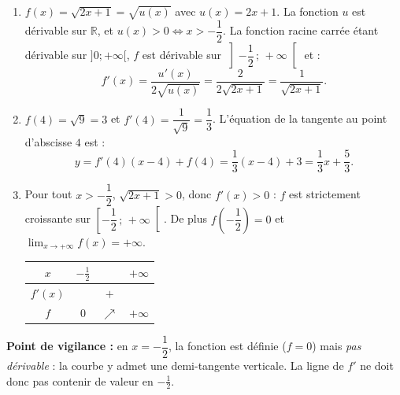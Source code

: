 \documentclass[11pt]{article}
\begin{document}
\begin{corrige}
\begin{enumerate}
\item $f(x)=\sqrt{2x+1}=\sqrt{u(x)}$ avec $u(x)=2x+1$. La fonction $u$ est dérivable sur $\mathbb{R}$, et $u(x)>0 \iff x>-\dfrac{1}{2}$. La fonction racine carrée étant dérivable sur $]0;+\infty[$, $f$ est dérivable sur $\left]-\dfrac{1}{2}\,;\,+\infty\right[$ et :
\[ f'(x)=\frac{u'(x)}{2\sqrt{u(x)}}=\frac{2}{2\sqrt{2x+1}}=\frac{1}{\sqrt{2x+1}}. \]
\item $f(4)=\sqrt{9}=3$ et $f'(4)=\dfrac{1}{\sqrt{9}}=\dfrac{1}{3}$. L'équation de la tangente au point d'abscisse $4$ est :
\[ y = f'(4)(x-4)+f(4) = \frac{1}{3}(x-4)+3 = \frac{1}{3}x+\frac{5}{3}. \]
\item Pour tout $x>-\dfrac{1}{2}$, $\sqrt{2x+1}>0$, donc $f'(x)>0$ : $f$ est strictement croissante sur $\left[-\dfrac{1}{2}\,;\,+\infty\right[$. De plus $f\left(-\dfrac{1}{2}\right)=0$ et $\lim_{x\to+\infty}f(x)=+\infty$.
\begin{center}
\begin{tabular}{|c|ccc|}
\hline
$x$ & $-\frac{1}{2}$ & & $+\infty$ \\
\hline
$f'(x)$ & & $+$ & \\
\hline
$f$ & $0$ & $\nearrow$ & $+\infty$ \\
\hline
\end{tabular}
\end{center}
\end{enumerate}
\textbf{Point de vigilance :} en $x=-\dfrac{1}{2}$, la fonction est définie ($f=0$) mais \emph{pas dérivable} : la courbe y admet une demi-tangente verticale. La ligne de $f'$ ne doit donc pas contenir de valeur en $-\frac{1}{2}$.
\end{corrige}
\end{document}
